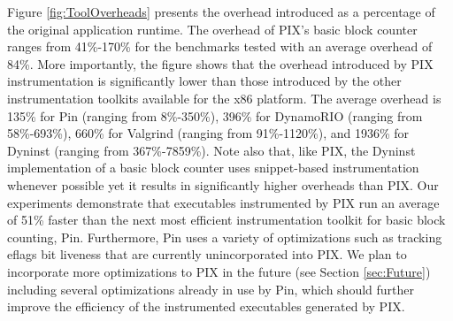 Figure \ref{fig:ToolOverheads} presents the overhead introduced as a percentage of the original application runtime. The
overhead of PIX's basic block counter ranges from 41\%-170\% for the benchmarks tested with an average overhead of 
84\%. More importantly, the figure shows that the overhead introduced by PIX instrumentation is significantly 
lower than those introduced by the other instrumentation toolkits available for the x86 platform. 
The average overhead is 135\% for Pin (ranging from 8\%-350\%), 
396\% for DynamoRIO (ranging from 58\%-693\%), 660\% for Valgrind (ranging from 91\%-1120\%), 
and 1936\% for Dyninst (ranging from 367\%-7859\%). Note also that, like PIX, the Dyninst
implementation of a basic block counter uses snippet-based instrumentation whenever possible yet
it results in significantly higher overheads than PIX.
Our experiments demonstrate that executables instrumented by PIX run an average of
51\% faster than the next most efficient instrumentation toolkit for basic block counting, Pin. Furthermore,
Pin uses a variety of optimizations such as tracking eflags bit liveness \cite{luk2005pin} that are currently
unincorporated into PIX. We plan to incorporate more optimizations to PIX in the future (see Section \ref{sec:Future}) including
several optimizations already in use by Pin, which should further improve the efficiency of the instrumented
executables generated by PIX.

